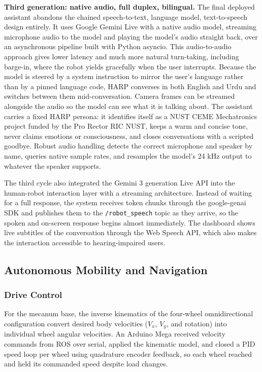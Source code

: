 \documentclass[11pt,a4paper]{article}
\begin{document}
\textbf{Third generation: native audio, full duplex, bilingual.} The final deployed assistant abandons the chained speech-to-text, language model, text-to-speech design entirely. It uses Google Gemini Live with a native audio model, streaming microphone audio to the model and playing the model's audio straight back, over an asynchronous pipeline built with Python asyncio. This audio-to-audio approach gives lower latency and much more natural turn-taking, including barge-in, where the robot yields gracefully when the user interrupts. Because the model is steered by a system instruction to mirror the user's language rather than by a pinned language code, HARP converses in both English and Urdu and switches between them mid-conversation. Camera frames can be streamed alongside the audio so the model can see what it is talking about. The assistant carries a fixed HARP persona: it identifies itself as a NUST CEME Mechatronics project funded by the Pro Rector RIC NUST, keeps a warm and concise tone, never claims emotions or consciousness, and closes conversations with a scripted goodbye. Robust audio handling detects the correct microphone and speaker by name, queries native sample rates, and resamples the model's 24 kHz output to whatever the speaker supports.

The third cycle also integrated the Gemini 3 generation Live API into the human-robot interaction layer with a streaming architecture. Instead of waiting for a full response, the system receives token chunks through the google-genai SDK and publishes them to the \texttt{/robot\_speech} topic as they arrive, so the spoken and on-screen response begins almost immediately. The dashboard shows live subtitles of the conversation through the Web Speech API, which also makes the interaction accessible to hearing-impaired users.

\subsection{Autonomous Mobility and Navigation}

\subsubsection{Drive Control}

For the mecanum base, the inverse kinematics of the four-wheel omnidirectional configuration convert desired body velocities ($V_x$, $V_y$, and rotation) into individual wheel angular velocities. An Arduino Mega received velocity commands from ROS over serial, applied the kinematic model, and closed a PID speed loop per wheel using quadrature encoder feedback, so each wheel reached and held its commanded speed despite load changes.
\end{document}

